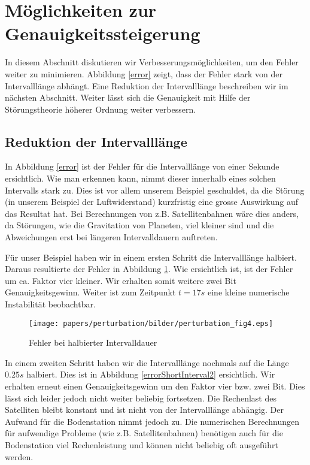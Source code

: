 \section{Möglichkeiten zur Genauigkeitssteigerung
\label{perturbation:section:weitereverbesserungen}}
In diesem Abschnitt diskutieren wir Verbesserungsmöglichkeiten, um den Fehler weiter zu minimieren.
Abbildung \ref{error} zeigt, dass der Fehler stark von der Intervalllänge abhängt.
Eine Reduktion der Intervalllänge beschreiben wir im nächsten Abschnitt.
Weiter lässt sich die Genauigkeit mit Hilfe der Störungstheorie höherer Ordnung weiter verbessern.

\subsection{Reduktion der Intervalllänge}
In Abbildung \ref{error} ist der Fehler für die Intervalllänge von einer Sekunde ersichtlich.
Wie man erkennen kann, nimmt dieser innerhalb eines solchen Intervalls stark zu.
Dies ist vor allem unserem Beispiel geschuldet, da die Störung (in unserem Beispiel der Luftwiderstand) kurzfristig eine grosse Auswirkung auf das Resultat hat.
Bei Berechnungen von z.B. Satellitenbahnen wäre dies anders, da Störungen,
wie die Gravitation von Planeten, viel kleiner sind und die Abweichungen erst bei längeren Intervalldauern auftreten.
%
%

Für unser Beispiel haben wir in einem ersten Schritt die Intervalllänge halbiert.
Daraus resultierte der Fehler in Abbildung \ref{errorShortInterval}.
Wie ersichtlich ist, ist der Fehler um ca. Faktor vier kleiner.
Wir erhalten somit weitere zwei Bit Genauigkeitsgewinn.
Weiter ist zum Zeitpunkt $t=17s$ eine kleine numerische Instabilität beobachtbar.

\begin{figure}
    \centering
    \texttt{[image: papers/perturbation/bilder/perturbation\_fig4.eps]}
    \caption{Fehler bei halbierter Intervalldauer}
	\label{errorShortInterval}
\end{figure}

In einem zweiten Schritt haben wir die Intervalllänge nochmals auf die Länge $0.25s$ halbiert.
Dies ist in Abbildung \ref{errorShortInterval2} ersichtlich.
Wir erhalten erneut einen Genauigkeitsgewinn um den Faktor vier bzw. zwei Bit.
Dies lässt sich leider jedoch nicht weiter beliebig fortsetzen.
Die Rechenlast des Satelliten bleibt konstant und ist nicht von der Intervalllänge abhängig.
Der Aufwand für die Bodenstation nimmt jedoch zu.
Die numerischen Berechnungen für aufwendige Probleme (wie z.B. Satellitenbahnen) benötigen auch für die Bodenstation viel Rechenleistung und
können nicht beliebig oft ausgeführt werden.

